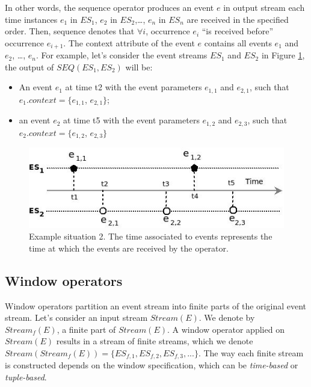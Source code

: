   In other words, the sequence operator produces an event $e$ in output stream each time instances $e_1$ in $ES_1$, $e_2$ in $ES_2$,…, $e_n$ in $ES_n$ are received in the specified order. 
 Then, sequence denotes that $\forall i$, occurrence $e_i$ “is received before” occurrence $e_{i+1}$. 
 The context attribute of the event $e$ contains all events $e_1$ and $e_2$, …, $e_n$. 
 For example, let's consider the event streams $ES_1$ and $ES_2$ in Figure \ref{fig:op_seq_exple}, the output of $SEQ(ES_1, ES_2)$ will be:
 \begin{itemize}
  \item An event $e_1$ at time t2 with the event parameters $e_{1,1}$ and $e_{2,1}$, such that $e_1.context=\{ e_{1,1}$, $e_{2,1}\}$;
  \item an event $e_2$ at time t5 with the event parameters $e_{1,2}$ and $e_{2,3}$, such that $e_2.context=\{ e_{1,2}$, $e_{2,3}\}$
 \end{itemize}
 \begin{figure}[h]
  \begin{center}
    \includegraphics[scale=0.65]{chap3/images/seqExample.jpeg}
  \end{center}
  \caption{Example situation 2. The time associated to events represents the time at which the events are received by the operator.}
  \label{fig:op_seq_exple}
\end{figure}
 \subsection{Window operators}
 Window operators partition an event stream into finite parts of the original event stream. Let's consider an input stream $Stream(E)$. We denote by $Stream_f(E)$, a finite part of $Stream(E)$. A window operator applied on $Stream(E)$ results in a stream of finite streams, which we denote $Stream(Stream_f(E))= \{ES_{f,1}, ES_{f,2}, ES_{f,3}, ...\}$.
 The way each finite stream is constructed depends on the window specification, which can be \textit{time-based} or \textit{tuple-based}.
